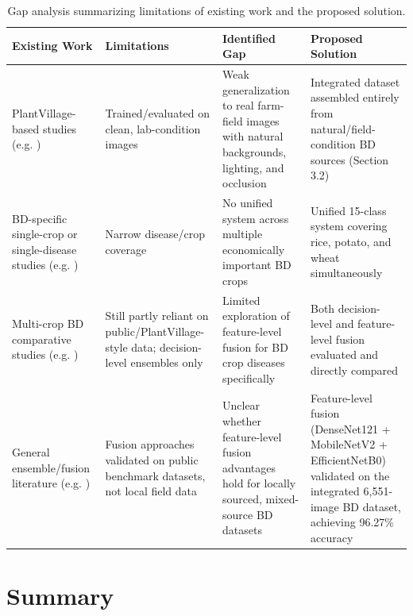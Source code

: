 \begin{table}[H]
\centering
\begin{tabular}{|p{3.2cm}|p{3.6cm}|p{3.4cm}|p{3.6cm}|}
\hline
\textbf{Existing Work} & \textbf{Limitations} & \textbf{Identified Gap} & \textbf{Proposed Solution} \\ \hline
PlantVillage-based studies (e.g. \cite{islam2020potato,chowdhury2023lightweight,ferentinos2018deep,alhammad2025potatoxai}) & Trained/evaluated on clean, lab-condition images & Weak generalization to real farm-field images with natural backgrounds, lighting, and occlusion & Integrated dataset assembled entirely from natural/field-condition BD sources (Section 3.2) \\ \hline
BD-specific single-crop or single-disease studies (e.g. \cite{uddin2021jute,mehnaz2025dhanshomadhan}) & Narrow disease/crop coverage & No unified system across multiple economically important BD crops & Unified 15-class system covering rice, potato, and wheat simultaneously \\ \hline
Multi-crop BD comparative studies (e.g. \cite{himel2022bdcrops,ahad2023rice}) & Still partly reliant on public/PlantVillage-style data; decision-level ensembles only & Limited exploration of feature-level fusion for BD crop diseases specifically & Both decision-level and feature-level fusion evaluated and directly compared \\ \hline
General ensemble/fusion literature (e.g. \cite{ensemble_featurefusion_2025,catalreis2022wheat,multiscale_wheat_fusion_2025,glnet2024wheat,leaffusionnet2026}) & Fusion approaches validated on public benchmark datasets, not local field data & Unclear whether feature-level fusion advantages hold for locally sourced, mixed-source BD datasets & Feature-level fusion (DenseNet121 + MobileNetV2 + EfficientNetB0) validated on the integrated 6,551-image BD dataset, achieving 96.27\% accuracy \\ \hline
\end{tabular}
\caption{Gap analysis summarizing limitations of existing work and the proposed solution.}
\label{tab:gap_analysis}
\end{table}

\section{Summary}

